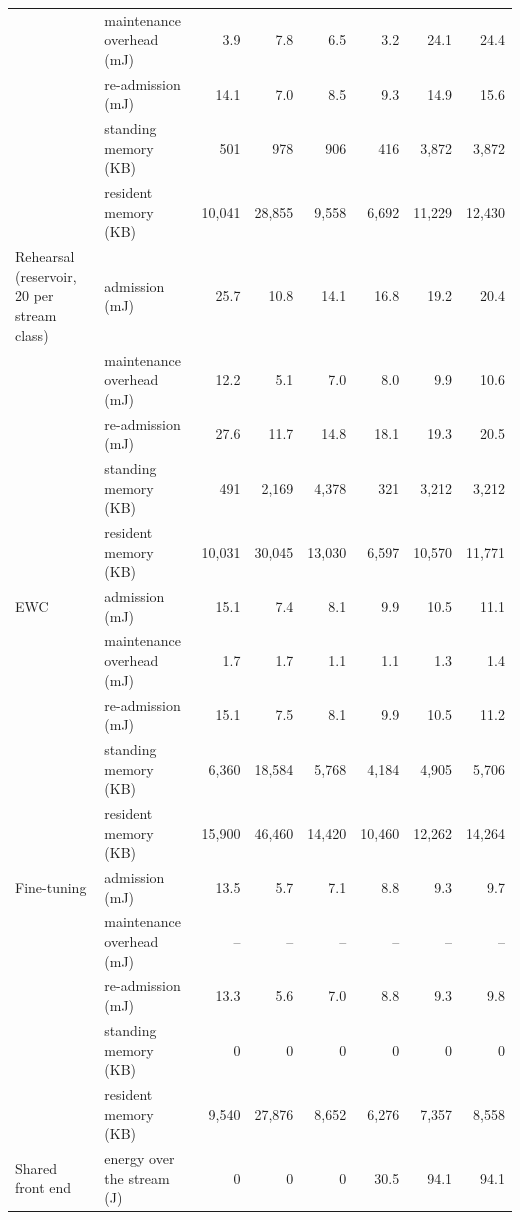 \begin{tabular*}{\textwidth}{@{\extracolsep{\fill}}lp{3.2cm}rrrrrr@{}}
 & maintenance overhead (mJ) & 3.9 & 7.8 & 6.5 & 3.2 & 24.1 & 24.4 \\
 & re-admission (mJ) & 14.1 & 7.0 & 8.5 & 9.3 & 14.9 & 15.6 \\
 & standing memory (KB) & 501 & 978 & 906 & 416 & 3,872 & 3,872 \\
 & resident memory (KB) & 10,041 & 28,855 & 9,558 & 6,692 & 11,229 & 12,430 \\
Rehearsal (reservoir, 20 per stream class) & admission (mJ) & 25.7 & 10.8 & 14.1 & 16.8 & 19.2 & 20.4 \\
 & maintenance overhead (mJ) & 12.2 & 5.1 & 7.0 & 8.0 & 9.9 & 10.6 \\
 & re-admission (mJ) & 27.6 & 11.7 & 14.8 & 18.1 & 19.3 & 20.5 \\
 & standing memory (KB) & 491 & 2,169 & 4,378 & 321 & 3,212 & 3,212 \\
 & resident memory (KB) & 10,031 & 30,045 & 13,030 & 6,597 & 10,570 & 11,771 \\
EWC & admission (mJ) & 15.1 & 7.4 & 8.1 & 9.9 & 10.5 & 11.1 \\
 & maintenance overhead (mJ) & 1.7 & 1.7 & 1.1 & 1.1 & 1.3 & 1.4 \\
 & re-admission (mJ) & 15.1 & 7.5 & 8.1 & 9.9 & 10.5 & 11.2 \\
 & standing memory (KB) & 6,360 & 18,584 & 5,768 & 4,184 & 4,905 & 5,706 \\
 & resident memory (KB) & 15,900 & 46,460 & 14,420 & 10,460 & 12,262 & 14,264 \\
Fine-tuning & admission (mJ) & 13.5 & 5.7 & 7.1 & 8.8 & 9.3 & 9.7 \\
 & maintenance overhead (mJ) & -- & -- & -- & -- & -- & -- \\
 & re-admission (mJ) & 13.3 & 5.6 & 7.0 & 8.8 & 9.3 & 9.8 \\
 & standing memory (KB) & 0 & 0 & 0 & 0 & 0 & 0 \\
 & resident memory (KB) & 9,540 & 27,876 & 8,652 & 6,276 & 7,357 & 8,558 \\
\midrule
Shared front end & energy over the stream (J) & 0 & 0 & 0 & 30.5 & 94.1 & 94.1 \\
\bottomrule
\end{tabular*}
